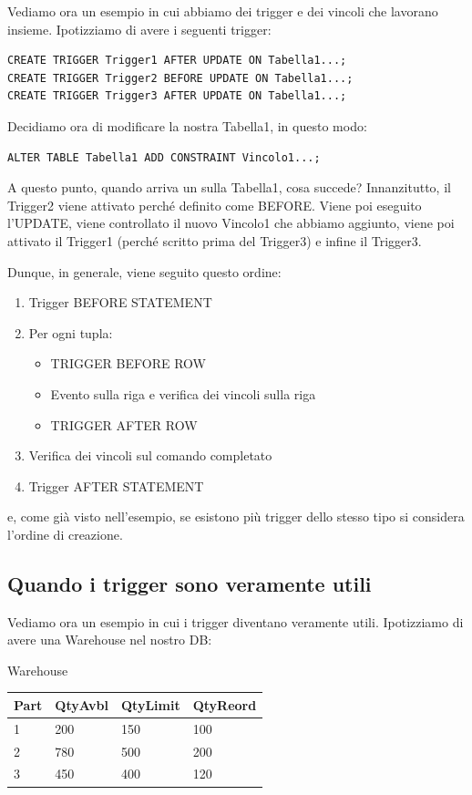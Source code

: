 \documentclass[11pt, a4paper, titlepage, oneside]{scrbook}
\begin{document}
Vediamo ora un esempio in cui abbiamo dei trigger e dei vincoli che lavorano insieme. Ipotizziamo di avere i seguenti trigger:
\begin{lstlisting}
CREATE TRIGGER Trigger1 AFTER UPDATE ON Tabella1...;
CREATE TRIGGER Trigger2 BEFORE UPDATE ON Tabella1...;
CREATE TRIGGER Trigger3 AFTER UPDATE ON Tabella1...;
\end{lstlisting}

Decidiamo ora di modificare la nostra Tabella1, in questo modo:
\begin{lstlisting}
ALTER TABLE Tabella1 ADD CONSTRAINT Vincolo1...;
\end{lstlisting}

A questo punto, quando arriva un  sulla Tabella1, cosa succede? Innanzitutto, il Trigger2 viene attivato perché definito come BEFORE. Viene poi eseguito l'UPDATE, viene controllato il nuovo Vincolo1 che abbiamo aggiunto, viene poi attivato il Trigger1 (perché scritto prima del Trigger3) e infine il Trigger3.

Dunque, in generale, viene seguito questo ordine:
\begin{enumerate}[label=\arabic*°]
    \item Trigger BEFORE STATEMENT
    \item Per ogni tupla:
    \begin{itemize}
        \item TRIGGER BEFORE ROW
        \item Evento sulla riga e verifica dei vincoli sulla riga
        \item TRIGGER AFTER ROW
    \end{itemize}
    \item Verifica dei vincoli sul comando completato
    \item Trigger AFTER STATEMENT
\end{enumerate}
e, come già visto nell'esempio, se esistono più trigger dello stesso tipo si considera l'ordine di creazione.

\subsection{Quando i trigger sono veramente utili}

Vediamo ora un esempio in cui i trigger diventano veramente utili. Ipotizziamo di avere una Warehouse nel nostro DB:

\begin{center}
Warehouse \nopagebreak

\begin{tabular}{|l|l|l|l|}
\hline
\textbf{Part} & \textbf{QtyAvbl} & \textbf{QtyLimit} & \textbf{QtyReord}\\ \hline
1 & 200 & 150 & 100 \\
2 & 780 & 500 & 200 \\
3 & 450 & 400 & 120 \\ \hline
\end{tabular}
\end{center}
\end{document}
